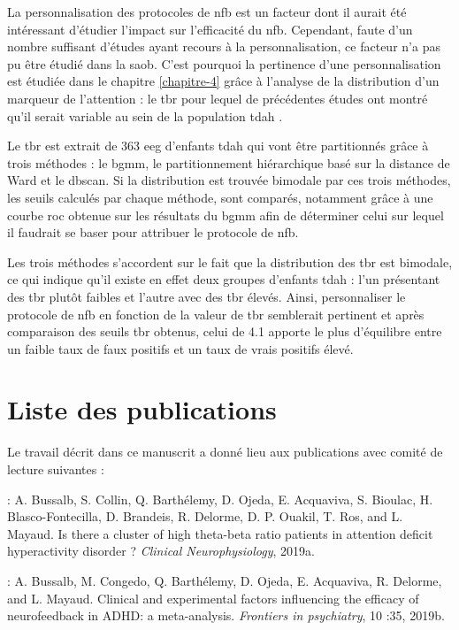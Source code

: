 La personnalisation des protocoles de \gls{nfb} est un facteur dont il aurait été intéressant d'étudier l'impact sur l'efficacité du \gls{nfb}.  
Cependant, faute d'un nombre suffisant d'études ayant recours à la personnalisation, ce facteur n'a pas pu être étudié dans la \gls{saob}. C'est pourquoi
la pertinence d'une personnalisation est étudiée dans le chapitre \ref{chapitre-4} grâce à l'analyse de la distribution d'un marqueur de l'attention : le \gls{tbr} pour
lequel de précédentes études ont montré qu'il serait variable au sein de la population \gls{tdah} \citep{Zhang2017, Arns2013, Clarke2001}.

Le \gls{tbr} est extrait de 363 \gls{eeg} d'enfants \gls{tdah} qui vont être partitionnés grâce à trois méthodes : le \gls{bgmm}, le partitionnement
hiérarchique basé sur la distance de Ward et le \gls{dbscan}. Si la distribution est trouvée bimodale par ces trois méthodes, les seuils calculés par chaque méthode,
sont comparés, notamment grâce à une courbe \gls{roc} obtenue sur
les résultats du \gls{bgmm} afin de déterminer celui sur lequel il faudrait se baser pour attribuer le protocole de \gls{nfb}.

Les trois méthodes s'accordent sur le fait que la distribution des \gls{tbr} est bimodale, ce qui indique qu'il existe en effet deux groupes d'enfants
\gls{tdah} : l'un présentant des \gls{tbr} plutôt faibles et l'autre avec des \gls{tbr} élevés. Ainsi, personnaliser le protocole de \gls{nfb} en 
fonction de la valeur de \gls{tbr} semblerait pertinent et après comparaison des seuils \gls{tbr} obtenus, celui de 4.1 apporte le plus d'équilibre entre 
un faible taux de faux positifs et un taux de vrais positifs élevé.  

\section{Liste des publications}

Le travail décrit dans ce manuscrit a donné lieu aux publications avec comité de lecture suivantes :

\begin{description}
\item \citet{Bussalb2019tbr} : A. Bussalb, S. Collin, Q. Barthélemy, D. Ojeda, E. Acquaviva, S. Bioulac, H. Blasco-Fontecilla,
D. Brandeis, R. Delorme, D. P. Ouakil, T. Ros, and L. Mayaud. Is there a cluster of high
theta-beta ratio patients in attention deficit hyperactivity disorder ? \textit{Clinical Neurophysiology}, 2019a.
\item \citet{Bussalb2019clinical} : A. Bussalb, M. Congedo, Q. Barthélemy, D. Ojeda, E. Acquaviva, R. Delorme,
and L. Mayaud. Clinical and experimental factors influencing the efficacy of
neurofeedback in ADHD: a meta-analysis. \textit{Frontiers in psychiatry}, 10 :35, 2019b.
\end{description}


